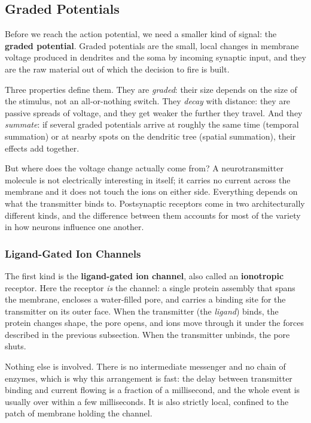 \documentclass[11pt]{article}
\begin{document}
\subsection{Graded Potentials}

Before we reach the action potential, we need a smaller kind of signal: the \textbf{graded potential}. Graded potentials are the small, local changes in membrane voltage produced in dendrites and the soma by incoming synaptic input, and they are the raw material out of which the decision to fire is built.

Three properties define them. They are \textit{graded}: their size depends on the size of the stimulus, not an all-or-nothing switch. They \textit{decay} with distance: they are passive spreads of voltage, and they get weaker the further they travel. And they \textit{summate}: if several graded potentials arrive at roughly the same time (temporal summation) or at nearby spots on the dendritic tree (spatial summation), their effects add together.

But where does the voltage change actually come from? A neurotransmitter molecule is not electrically interesting in itself; it carries no current across the membrane and it does not touch the ions on either side. Everything depends on what the transmitter binds to. Postsynaptic receptors come in two architecturally different kinds, and the difference between them accounts for most of the variety in how neurons influence one another.

\subsubsection{Ligand-Gated Ion Channels}

The first kind is the \textbf{ligand-gated ion channel}, also called an \textbf{ionotropic} receptor. Here the receptor \textit{is} the channel: a single protein assembly that spans the membrane, encloses a water-filled pore, and carries a binding site for the transmitter on its outer face. When the transmitter (the \textit{ligand}) binds, the protein changes shape, the pore opens, and ions move through it under the forces described in the previous subsection. When the transmitter unbinds, the pore shuts.

Nothing else is involved. There is no intermediate messenger and no chain of enzymes, which is why this arrangement is fast: the delay between transmitter binding and current flowing is a fraction of a millisecond, and the whole event is usually over within a few milliseconds. It is also strictly local, confined to the patch of membrane holding the channel.
\end{document}
